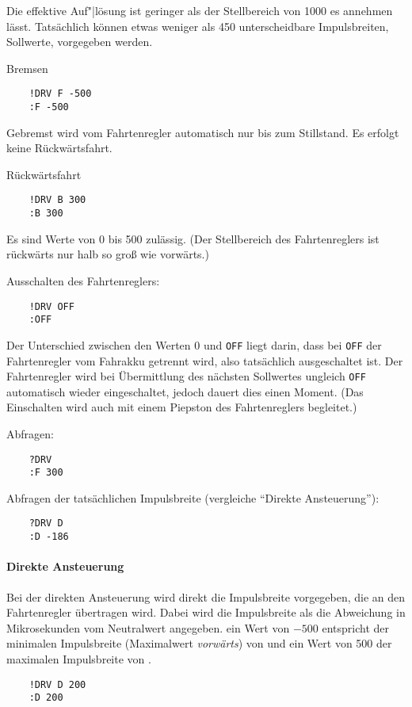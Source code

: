 Die effektive Auf"|lösung ist geringer als der Stellbereich von 1000 es annehmen lässt. Tatsächlich können etwas weniger als 450 unterscheidbare Impulsbreiten, \dah Sollwerte, vorgegeben werden.

Bremsen
\begin{verbatim}
	!DRV F -500
	:F -500
\end{verbatim}
Gebremst wird vom Fahrtenregler automatisch nur bis zum Stillstand. Es erfolgt keine Rückwärtsfahrt.


Rückwärtsfahrt
\begin{verbatim}
	!DRV B 300
	:B 300
\end{verbatim}
Es sind Werte von 0 bis 500 zulässig. (Der Stellbereich des Fahrtenreglers ist rückwärts nur halb so groß wie vorwärts.)




Ausschalten des Fahrtenreglers:
\begin{verbatim}
	!DRV OFF
	:OFF
\end{verbatim}
Der Unterschied zwischen den Werten 0 und \verb|OFF| liegt darin, dass bei \verb|OFF| der Fahrtenregler vom Fahrakku getrennt wird, also tatsächlich ausgeschaltet ist. Der Fahrtenregler wird bei Übermittlung des nächsten Sollwertes ungleich \verb|OFF| automatisch wieder eingeschaltet, jedoch dauert dies einen Moment. (Das Einschalten wird auch mit einem Piepston des Fahrtenreglers begleitet.)


Abfragen:
\begin{verbatim}
	?DRV
	:F 300
\end{verbatim}


Abfragen der tatsächlichen Impulsbreite (vergleiche "`Direkte Ansteuerung"'):
\begin{verbatim}
	?DRV D
	:D -186
\end{verbatim}


\paragraph{Direkte Ansteuerung}
Bei der direkten Ansteuerung wird direkt die Impulsbreite vorgegeben, die an den Fahrtenregler übertragen wird. Dabei wird die Impulsbreite als die Abweichung in Mikrosekunden vom Neutralwert  angegeben. \Dah ein Wert von $-500$ entspricht der minimalen Impulsbreite (\dah Maximalwert \emph{vorwärts}) von  und ein Wert von 500 der maximalen Impulsbreite von .


\begin{verbatim}
	!DRV D 200
	:D 200
\end{verbatim}





